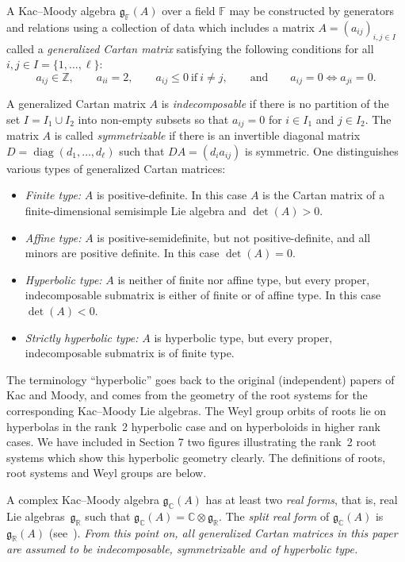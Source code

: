 \documentclass[pdftex]{sigma}
\numberwithin{equation}{section}
\def\C{{\mathbb C}}
\def\F{{\mathbb F}}
\def\R{\mathbb{R}}
\def\Z{\mathbb{Z}}
\def\fg{\mathfrak{g}}
\begin{document}
\noindent A Kac--Moody algebra $\mathfrak{g}_{\F}(A)$ over a field $\F$ may be constructed by generators and relations using a collection of data which includes a matrix $A=(a_{ij})_{i,j\in I}$ called a {\it generalized Cartan matrix} satisfying the following conditions for all $i,j\in I=\{1,\dots ,\ell\}$:
\[a_{ij}\in{\Z}, \qquad a_{ii}=2, \qquad a_{ij}\leq 0 \ \text{if} \ i\neq j, \qquad\text{and}\qquad a_{ij}=0 \iff a_{ji}=0. \]

A generalized Cartan matrix $A$ is {\it indecomposable} if there is no partition of the set $I = I_1\cup I_2$ into non-empty subsets
so that $a_{ij}=0$ for $i\in I_1$ and $j\in I_2$. The matrix $A$ is called {\it symmetrizable} if there is an invertible diagonal matrix
$D = \operatorname{diag}(d_1,\dots,d_\ell)$ such that $DA=(d_i a_{ij})$ is symmetric. One distinguishes various types of generalized Cartan matrices:
\begin{itemize}\itemsep=0pt
 \item[--] {\it Finite type:} $A$ is positive-definite. In this case $A$ is the Cartan matrix of a finite-dimensional semisimple Lie algebra and $\det(A)>0$.
 \item[--] {\it Affine type:} $A$ is positive-semidefinite, but not positive-definite, and all minors are positive definite. In this case $\det(A)=0$.
 \item[--] {\it Hyperbolic type:} $A$ is neither of finite nor affine type, but every proper, indecomposable submatrix is either of finite or of affine type. In this case $\det(A)<0$.
 \item[--] {\it Strictly hyperbolic type:} $A$ is hyperbolic type, but every proper, indecomposable submatrix is of finite type.
\end{itemize}

The terminology ``hyperbolic'' goes back to the original (independent) papers of Kac and Moody, and comes from the
geometry of the root systems for the corresponding Kac--Moody Lie algebras. The Weyl group orbits of roots lie on hyperbolas in the
rank~2 hyperbolic case and on hyperboloids in higher rank cases. We have included in Section 7 two figures illustrating the rank~2 root
systems which show this hyperbolic geometry clearly. The definitions of roots, root systems and Weyl groups are below.

A complex Kac--Moody algebra $\fg_\C(A)$ has at least two {\em real forms}, that is, real Lie algebras~$\fg_\R$ such that $\fg_\C(A) = \C\otimes \fg_\R$. The {\em split real form} of $\fg_\C(A)$ is $\fg_\R(A)$ (see~\cite{BBMR95}). {\it From this point on, all generalized Cartan matrices in this paper are assumed to be indecomposable, symmetrizable and of hyperbolic type.}
\end{document}
